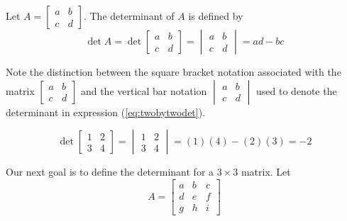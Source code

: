\documentclass{ximera}
\begin{document}
\begin{definition}\label{def:twobytwodet}
Let $A=\begin{bmatrix}a&b\\c&d\end{bmatrix}$.  The determinant of $A$ is defined by 
\begin{equation}\label{eq:twobytwodet}\det{A}=\det{\begin{bmatrix}a&b\\c&d\end{bmatrix}}=\begin{vmatrix}a&b\\c&d\end{vmatrix}=ad-bc\end{equation}
\end{definition}
Note the distinction between the square bracket notation associated with the matrix $\begin{bmatrix}a&b\\c&d\end{bmatrix}$ and the vertical bar notation $\begin{vmatrix}a&b\\c&d\end{vmatrix}$ used to denote  the determinant in expression (\ref{eq:twobytwodet}).

\begin{example}\label{ex:2x2det}
$$\det{\begin{bmatrix}1&2\\3&4\end{bmatrix}}=\begin{vmatrix}1&2\\3&4\end{vmatrix}=(1)(4)-(2)(3)=-2$$
\end{example}

Our next goal is to define  the determinant for a $3\times 3$ matrix.  Let 
$$A=\begin{bmatrix}a&b&c\\d&e&f\\g&h&i\end{bmatrix}$$
\end{document}
